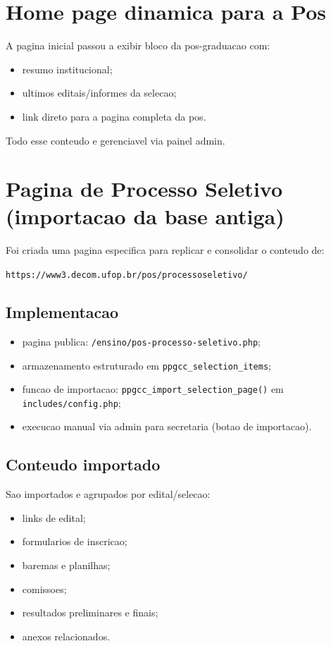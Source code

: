 \documentclass[12pt,a4paper]{article}
\begin{document}
\section{Home page dinamica para a Pos}
A pagina inicial passou a exibir bloco da pos-graduacao com:
\begin{itemize}
    \item resumo institucional;
    \item ultimos editais/informes da selecao;
    \item link direto para a pagina completa da pos.
\end{itemize}
Todo esse conteudo e gerenciavel via painel admin.

\section{Pagina de Processo Seletivo (importacao da base antiga)}
Foi criada uma pagina especifica para replicar e consolidar o conteudo de:
\begin{center}
\texttt{https://www3.decom.ufop.br/pos/processoseletivo/}
\end{center}

\subsection{Implementacao}
\begin{itemize}
    \item pagina publica: \texttt{/ensino/pos-processo-seletivo.php};
    \item armazenamento estruturado em \texttt{ppgcc\_selection\_items};
    \item funcao de importacao: \texttt{ppgcc\_import\_selection\_page()} em \texttt{includes/config.php};
    \item execucao manual via admin para secretaria (botao de importacao).
\end{itemize}

\subsection{Conteudo importado}
Sao importados e agrupados por edital/selecao:
\begin{itemize}
    \item links de edital;
    \item formularios de inscricao;
    \item baremas e planilhas;
    \item comissoes;
    \item resultados preliminares e finais;
    \item anexos relacionados.
\end{itemize}
\end{document}
